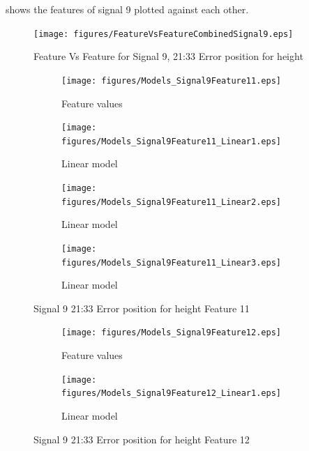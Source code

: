 \documentclass[]{article}
\begin{document}
 shows the features of signal 9 plotted against each other.
\begin{figure}[H]
    \centering
    \texttt{[image: figures/FeatureVsFeatureCombinedSignal9.eps]}
    \caption{Feature Vs Feature for Signal 9, 21:33 Error position for height}
    \label{fig:FeatureVsFeatureCombinedSignal9}
\end{figure}

\begin{figure}[H]
	\captionsetup[subfigure]{justification=Centering}
    \centering
		\begin{subfigure}{.45\textwidth}
		  \centering
    			\texttt{[image: figures/Models\_Signal9Feature11.eps]}
		  	\caption{Feature values}
		  	\label{fig:Models_Signal9Feature11}
		\end{subfigure}\hspace{\fill} %
		\begin{subfigure}{.45\textwidth}
		  \centering
 		   	\texttt{[image: figures/Models\_Signal9Feature11\_Linear1.eps]}
		  	\caption{Linear model}
		  	\label{fig:Models_Signal9Feature11_Linear1}
		\end{subfigure}
		\bigskip
		\begin{subfigure}{.45\textwidth}
		  \centering
    			\texttt{[image: figures/Models\_Signal9Feature11\_Linear2.eps]}
		  	\caption{Linear model}
		  	\label{fig:Models_Signal9Feature11_Linear2}
		\end{subfigure}\hspace{\fill} %
		\begin{subfigure}{.45\textwidth}
		  \centering
 		   	\texttt{[image: figures/Models\_Signal9Feature11\_Linear3.eps]}
		  	\caption{Linear model}
		  	\label{fig:Models_Signal9Feature11_Linear3}
		\end{subfigure}
    \caption{Signal 9 21:33 Error position for height Feature 11}
    \label{fig:Models_Signal9Feature11_Caption}
\end{figure}



\begin{figure}[H]
    \centering
		\begin{subfigure}{.5\textwidth}
		  \centering
    			\texttt{[image: figures/Models\_Signal9Feature12.eps]}
		  	\caption{Feature values}
		  	\label{fig:Models_Signal9Feature12}
		\end{subfigure}%
		\begin{subfigure}{.5\textwidth}
		  \centering
 		   	\texttt{[image: figures/Models\_Signal9Feature12\_Linear1.eps]}
		  	\caption{Linear model}
		  	\label{fig:Models_Signal9Feature12_Linear1}
		\end{subfigure}
    \caption{Signal 9 21:33 Error position for height Feature 12}
    \label{fig:Models_Signal9Feature12_Caption}
\end{figure}
\end{document}
